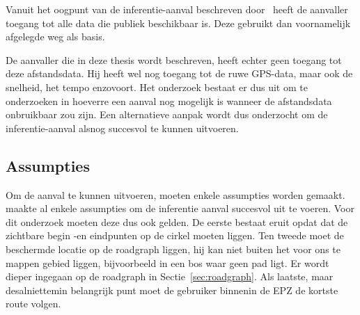 Vanuit het oogpunt van de inferentie-aanval beschreven
door~\citeauthor{Dhondt_Pochat_Voulimeneas_Joosen_Volckaert_2022} heeft de
aanvaller toegang tot alle data die publiek beschikbaar is. Deze gebruikt dan
voornamelijk afgelegde weg als basis.

De aanvaller die in deze thesis wordt beschreven, heeft echter geen toegang tot
deze afstandsdata. Hij heeft wel nog toegang tot de ruwe GPS-data, maar ook de
snelheid, het tempo enzovoort. Het onderzoek bestaat er dus uit om te
onderzoeken in hoeverre een aanval nog mogelijk is wanneer de afstandsdata
onbruikbaar zou zijn. Een alternatieve aanpak wordt dus onderzocht om de
inferentie-aanval alsnog succesvol te kunnen uitvoeren.

\subsection{Assumpties}
Om de aanval te kunnen uitvoeren, moeten enkele assumpties worden gemaakt.
\citeauthor{Dhondt_Pochat_Voulimeneas_Joosen_Volckaert_2022} maakte al enkele
assumpties om de inferentie aanval succesvol uit te voeren. Voor dit onderzoek
moeten deze dus ook gelden. De eerste bestaat eruit opdat dat de zichtbare
begin -en eindpunten op de cirkel moeten liggen. Ten tweede moet de beschermde
locatie op de roadgraph liggen, hij kan niet buiten het voor ons te mappen
gebied liggen, bijvoorbeeld in een bos waar geen pad ligt. Er wordt dieper
ingegaan op de roadgraph in Sectie~\ref{sec:roadgraph}. Als laatste, maar
desalniettemin belangrijk punt moet de gebruiker binnenin de \ac{EPZ} de
kortste route volgen.~\cite{Dhondt_Pochat_Voulimeneas_Joosen_Volckaert_2022}

